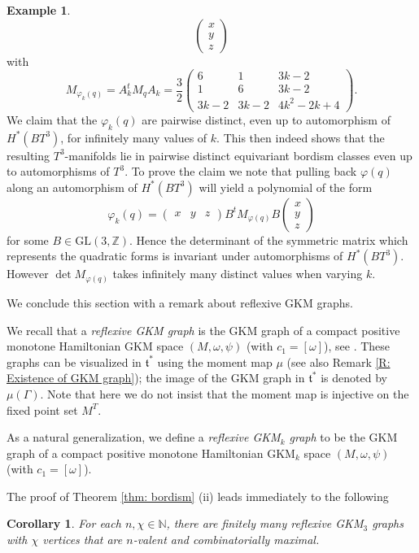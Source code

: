 \documentclass[12pt,a4paper]{amsart}
\newcommand{\GL}{\mathrm{GL}}
\newcommand{\ZZ}{\mathbb{Z}}
\newcommand{\NN}{\mathbb{N}}
\newtheorem{cor}[thm]{Corollary}
\theoremstyle{plain}
\theoremstyle{definition}
\newtheorem{ex}[thm]{Example}
\begin{document}
\begin{ex}
\[\begin{pmatrix}
x\\y\\z
\end{pmatrix}\]
with \[M_{\varphi_k(q)}= A_k^t M_q A_k = \frac{3}{2}\begin{pmatrix}
6 & 1 & 3k-2\\ 1 & 6 & 3k-2\\ 3k-2& 3k-2 & 4k^2- 2k +4
\end{pmatrix}.\]
We claim that the $\varphi_k(q)$ are pairwise distinct, even up to automorphism of $H^*(BT^3)$, for infinitely many values of $k$. This then indeed shows that the resulting $T^3$-manifolds lie in pairwise distinct equivariant bordism classes even up to automorphisms of $T^3$. To prove the claim we note that pulling back $\varphi(q)$ along an automorphism of $H^*(BT^3)$ will yield a polynomial of the form
\[\varphi_k(q)=\begin{pmatrix}
x&y&z
\end{pmatrix}
B^t
 M_{\varphi(q)}
B
\begin{pmatrix}
x\\y\\z
\end{pmatrix}\]
for some $B\in \GL(3,\ZZ)$. Hence the determinant of the symmetric matrix which represents the quadratic forms is invariant under automorphisms of $H^*(BT^3)$. However $\det M_{\varphi(q)}$
takes infinitely many distinct values when varying $k$.
\end{ex}

We conclude this section with a remark about reflexive GKM graphs. 

We recall that a \emph{reflexive GKM graph} is the GKM graph of a compact positive monotone Hamiltonian GKM space $(M,\omega,\psi)$ (with $c_1=[\omega]$),
see \cite[Definition 5.13 and Proposition 5.15]{MR3695881}. These graphs can be visualized in $\mathfrak{t}^*$ using the moment map $\mu$ (see also Remark \ref{R: Existence of GKM graph}); 
the image of the GKM graph in $\mathfrak{t}^*$ is denoted by $\mu(\Gamma)$.
Note that here we do not insist that the moment map is injective on the fixed point set $M^T$. 

As a natural generalization, we define a \emph{reflexive GKM$_k$ graph} to be the GKM graph of a compact positive monotone Hamiltonian GKM$_k$ space $(M,\omega,\psi)$ (with $c_1=[\omega]$).

The proof of Theorem \ref{thm: bordism} (ii) leads immediately to the following
\begin{cor}\label{cor reflexive graphs}
For each $n,\chi\in\NN$, there are finitely many reflexive GKM$_3$ graphs with $\chi$ vertices that are $n$-valent and combinatorially maximal.
\end{cor}
\end{document}

